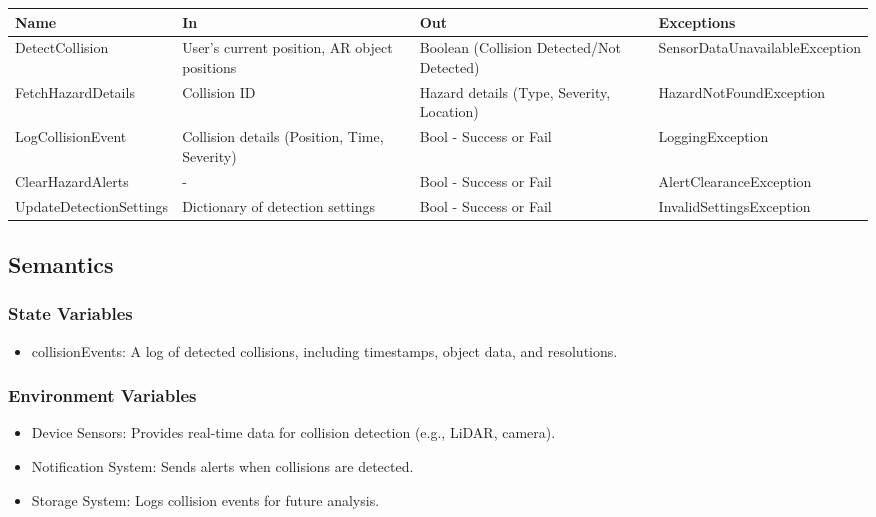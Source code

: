 \documentclass[12pt, titlepage]{article}
\begin{document}
\begin{center}
  \begin{tabular}{p{4.2cm} p{3cm} p{3cm} p{4cm}}
    \hline
    \textbf{Name}           & \textbf{In}                                  & \textbf{Out}                              & \textbf{Exceptions}            \\
    \hline
    DetectCollision         & User’s current position, AR object positions & Boolean (Collision Detected/Not Detected) & SensorDataUnavailableException \\
    \hline
    FetchHazardDetails      & Collision ID                                 & Hazard details (Type, Severity, Location) & HazardNotFoundException        \\
    \hline
    LogCollisionEvent       & Collision details (Position, Time, Severity) & Bool - Success or Fail                    & LoggingException               \\
    \hline
    ClearHazardAlerts       & -                                            & Bool - Success or Fail                    & AlertClearanceException        \\
    \hline
    UpdateDetectionSettings & Dictionary of detection settings             & Bool - Success or Fail                    & InvalidSettingsException       \\
    \hline
  \end{tabular}
\end{center}


\subsection{Semantics}

\subsubsection{State Variables}

\begin{itemize}
  \item collisionEvents: A log of detected collisions, including timestamps, object data, and resolutions.
\end{itemize}

\subsubsection{Environment Variables}

\begin{itemize}
  \item Device Sensors: Provides real-time data for collision detection (e.g., LiDAR, camera).
  \item Notification System: Sends alerts when collisions are detected.
  \item Storage System: Logs collision events for future analysis.
\end{itemize}
\end{document}
